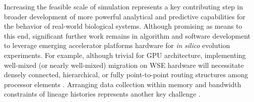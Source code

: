 Increasing the feasible scale of simulation represents a key contributing step in broader development of more powerful analytical and predictive capabilities for the behavior of real-world biological systems.
Although promising as means to this end, significant further work remains in algorithm and software development to leverage emerging accelerator platforms hardware for \textit{in silico} evolution experiments.
For example, although trivial for GPU architecture, implementing well-mixed (or nearly well-mixed) migration on WSE hardware will necessitate densely connected, hierarchical, or fully point-to-point routing structures among processor elements \citep{james2020physical,luczynski2024near}.
Arranging data collection within memory and bandwidth constraints of lineage histories represents another key challenge \citep{moreno2024trackable}.
